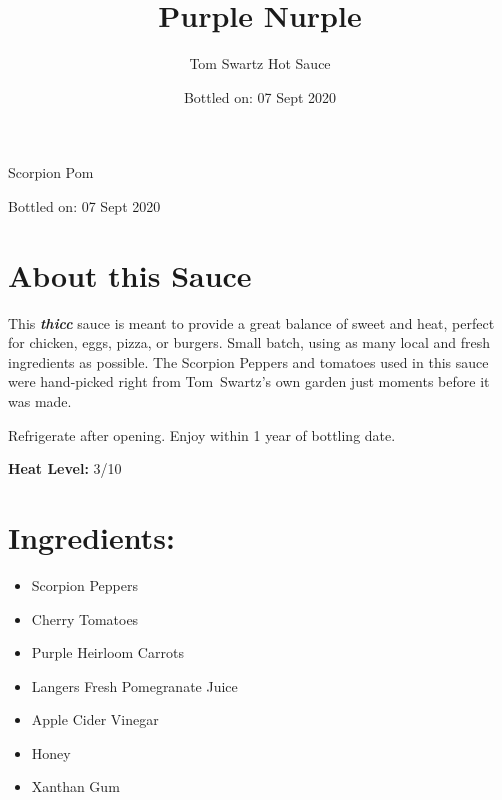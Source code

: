 \documentclass[12pt]{article}
\title{Purple Nurple}
\author{Tom Swartz Hot Sauce}
\date{Bottled on: 07 Sept 2020}
\begin{document}
\begin{center}
{\Huge Scorpion Pom}
\par
{\Large Bottled on: 07 Sept 2020}
\vfill
\begin{minipage}{0.45\textwidth}
\Large
\section*{About this Sauce \color{black}\hrulefill\color{black}}
This \emph{\textbf{thicc}} sauce is meant to provide a great balance of sweet and heat,
perfect for chicken, eggs, pizza, or burgers.
Small batch, using as many local and fresh ingredients as possible.
The Scorpion Peppers and tomatoes used in this sauce were
hand-picked right from Tom~Swartz's own garden just moments before it was made.
\par
Refrigerate after opening.
Enjoy within 1 year of bottling date.

\begin{center}
        {\LARGE
        \textbf{Heat Level:} 3/10
        }
\end{center}
\end{minipage}
\hfill
\begin{minipage}{0.45\textwidth}
\vspace{-0.4cm}
\Large
\section*{\hspace{0.5cm}Ingredients: \color{black}\hrulefill\color{black}}
\begin{itemize}
        \item Scorpion Peppers
        \item Cherry Tomatoes
        \item Purple Heirloom Carrots
        \item Langers Fresh Pomegranate Juice
        \item Apple Cider Vinegar
        \item Honey
        \item Xanthan Gum
\end{itemize}
\end{minipage}
\end{center}
\end{document}
